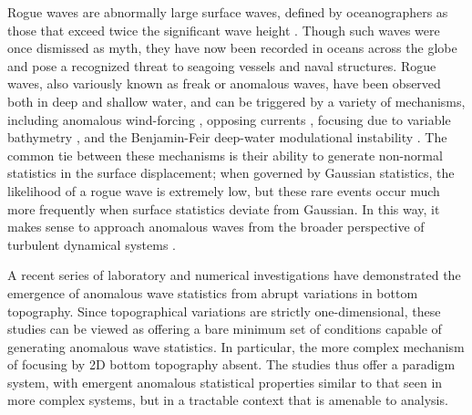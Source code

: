 \documentclass[11pt]{article}
\begin{document}
Rogue waves are abnormally large surface waves, defined by oceanographers as those that exceed twice the significant wave height \citep{muller2005rogue, ying2011linear}. Though such waves were once dismissed as myth, they have now been recorded in oceans across the globe and pose a recognized threat to seagoing vessels and naval structures. Rogue waves, also variously known as freak or anomalous waves, have been observed both in deep and shallow water, and can be triggered by a variety of mechanisms, including anomalous wind-forcing \citep{kharif2008influence, toffoli2017wind}, opposing currents \citep{garrett2009rogue, onorato2011triggering},
focusing due to variable bathymetry \citep{heller2008refraction, white1998chance}, 
and the Benjamin-Feir deep-water modulational instability \citep{benjamin1967disintegration, viotti2013emergence, cousins2015unsteady, farazmand2017reduced}.
The common tie between these mechanisms is their ability to generate non-normal statistics in the surface displacement; when governed by Gaussian statistics, the likelihood of a rogue wave is extremely low, but these rare events occur much more frequently when surface statistics deviate from Gaussian. In this way, it makes sense to approach anomalous waves from the broader perspective of turbulent dynamical systems \cite{sapsis2013a, sapsis2013b, sapsis2013blending, chen2016filtering, majda2016introduction, macedo2017universality, MajdaQiSIAM2018, blonigan2019extreme, guth2019machine}.

A recent series of laboratory \cite{bolles2019} and numerical investigations \cite{viotti2014} have demonstrated the emergence of anomalous wave statistics from abrupt variations in bottom topography. Since topographical variations are strictly one-dimensional, these studies can be viewed as offering a bare minimum set of conditions capable of generating anomalous wave statistics. In particular, the more complex mechanism of focusing by 2D bottom topography absent. The studies thus offer a paradigm system, with emergent anomalous statistical properties similar to that seen in more complex systems, but in a tractable context that is amenable to analysis.
\end{document}
